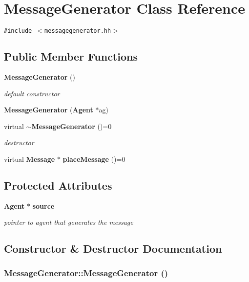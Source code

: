\section{MessageGenerator Class Reference}
\label{classMessageGenerator}
{\tt \#include $<$messagegenerator.hh$>$}

\subsection*{Public Member Functions}
\begin{CompactItemize}
\item 
{\bf MessageGenerator} ()
\begin{CompactList}\small\item\em default constructor \item\end{CompactList}\item 
{\bf MessageGenerator} ({\bf Agent} $\ast$ag)
\item 
virtual {\bf $\sim$MessageGenerator} ()=0
\begin{CompactList}\small\item\em destructor \item\end{CompactList}\item 
virtual {\bf Message} $\ast$ {\bf placeMessage} ()=0
\end{CompactItemize}
\subsection*{Protected Attributes}
\begin{CompactItemize}
\item 
{\bf Agent} $\ast$ {\bf source}
\begin{CompactList}\small\item\em pointer to agent that generates the message \item\end{CompactList}\end{CompactItemize}


\subsection{Constructor \& Destructor Documentation}
\subsubsection[MessageGenerator]{\setlength{\rightskip}{0pt plus 5cm}MessageGenerator::MessageGenerator ()}\label{classMessageGenerator_bb8f104459b6f93d0f6b26d656cf70ef}


